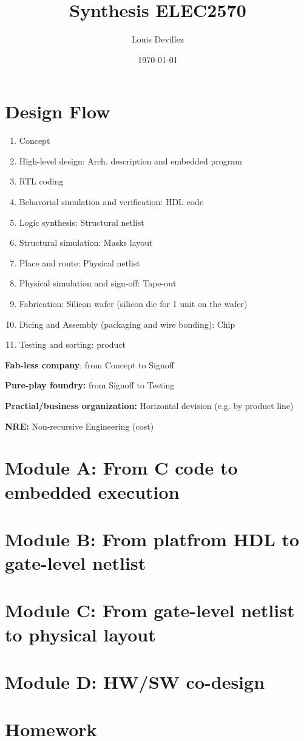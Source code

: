 


\title{Synthesis ELEC2570}
\author{Louis Devillez}
\date{\today}



\maketitle

\tableofcontents
\section{Design Flow}
\begin{enumerate}
  \item Concept
  \item High-level design: Arch. description and embedded program
  \item RTL coding
  \item Behavorial simulation and verification: HDL code
  \item Logic synthesis: Structural netlist
  \item Structural simulation: Masks layout
  \item Place and route: Physical netlist
  \item Physical simulation and sign-off: Tape-out
  \item Fabrication: Silicon wafer (silicon die for 1 unit on the wafer)
  \item Dicing and Assembly (packaging and wire bonding): Chip
  \item Testing and sorting: product
\end{enumerate}

\textbf{Fab-less company}: from Concept to Signoff

\textbf{Pure-play foundry:} from Signoff to Testing

\textbf{Practial/business organization:} Horizontal devision (e.g. by product line)

\textbf{NRE:} Non-recursive Engineering (cost)
      
\section{Module A: From C code to embedded execution}

\section{Module B: From platfrom HDL to gate-level netlist}


\section{Module C: From gate-level netlist to physical layout}

\section{Module D: HW/SW co-design}


\section{Homework}





